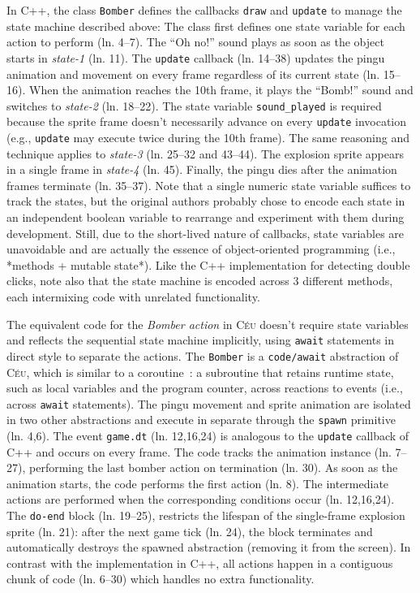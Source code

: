 \documentclass{vgtc}                          %
\newcommand{\CEU}{\textsc{C\'{e}u}\xspace}
\newcommand{\code}[1] {{\small{\texttt{#1}}}}
\begin{document}
In C++, the class \code{Bomber} defines the callbacks \code{draw} and
\code{update} to manage the state machine described above:
%
The class first defines one state variable for each action to perform
(ln. 4--7).
The ``Oh no!'' sound plays as soon as the object starts in \emph{state-1} 
(ln. 11).
The \code{update} callback (ln. 14--38) updates the pingu animation and
movement on every frame regardless of its current state (ln. 15--16).
When the animation reaches the 10th frame, it plays the ``Bomb!'' sound and 
switches to \emph{state-2} (ln. 18--22).
The state variable \code{sound\_played} is required because the sprite frame
doesn't necessarily advance on every \code{update} invocation (e.g.,
\code{update} may execute twice during the 10th frame).
The same reasoning and technique applies to \emph{state-3} (ln. 25--32 and
43--44).
The explosion sprite appears in a single frame in \emph{state-4} (ln. 45).
Finally, the pingu dies after the animation frames terminate (ln. 35--37).
%
Note that a single numeric state variable suffices to track the states, but the
original authors probably chose to encode each state in an independent boolean 
variable to rearrange and experiment with them during development.
Still, due to the short-lived nature of callbacks, state variables are 
unavoidable and are actually the essence of object-oriented programming
(i.e., *methods + mutable state*).
%
Like the C++ implementation for detecting double clicks, note also that the
state machine is encoded across 3 different methods, each intermixing code with
unrelated functionality.

The equivalent code for the \emph{Bomber action} in \CEU doesn't require state
variables and reflects the sequential state machine implicitly, using
\code{await} statements in direct style to separate the actions.
%
The \code{Bomber} is a \code{code/await} abstraction of \CEU, which is similar
to a coroutine~\cite{sync_async.cooperative}: a subroutine that retains runtime
state, such as local variables and the program counter, across reactions to
events (i.e., across \code{await} statements).
The pingu movement and sprite animation are isolated in two other abstractions
and execute in separate through the \code{spawn} primitive (ln. 4,6).
The event \code{game.dt} (ln. 12,16,24) is analogous to the \code{update}
callback of C++ and occurs on every frame.
%
The code tracks the animation instance (ln. 7--27), performing the last bomber
action on termination (ln. 30).
As soon as the animation starts, the code performs the first action (ln. 8).
The intermediate actions are performed when the corresponding conditions occur
(ln. 12,16,24).
The \code{do-end} block (ln. 19--25), restricts the lifespan of the
single-frame explosion sprite (ln. 21): after the next game tick (ln. 24), the
block terminates and automatically destroys the spawned abstraction (removing
it from the screen).
%
In contrast with the implementation in C++, all actions happen in a contiguous
chunk of code (ln. 6--30) which handles no extra functionality.
\end{document}
